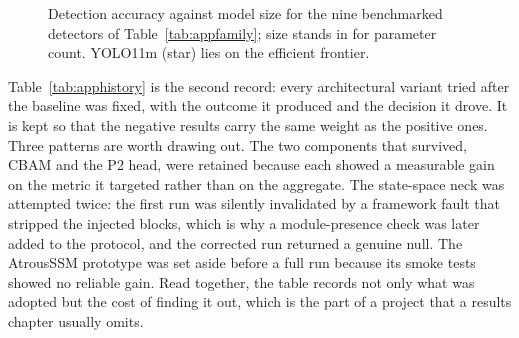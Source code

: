 \documentclass[12pt,a4paper,oneside]{report}
\begin{document}
\begin{figure}[H]
  \centering
  \caption{Detection accuracy against model size for the nine benchmarked detectors of Table~\ref{tab:appfamily}; size stands in for parameter count. YOLO11m (star) lies on the efficient frontier.}
  \label{fig:appfrontier}
\end{figure}

Table~\ref{tab:apphistory} is the second record: every architectural variant
tried after the baseline was fixed, with the outcome it produced and the
decision it drove. It is kept so that the negative results carry the same weight
as the positive ones. Three patterns are worth drawing out. The two components
that survived, CBAM and the P2 head, were retained because each showed a
measurable gain on the metric it targeted rather than on the aggregate. The
state-space neck was attempted twice: the first run was silently invalidated by
a framework fault that stripped the injected blocks, which is why a
module-presence check was later added to the protocol, and the corrected run
returned a genuine null. The AtrousSSM prototype was set aside before a full run
because its smoke tests showed no reliable gain. Read together, the table
records not only what was adopted but the cost of finding it out, which is the
part of a project that a results chapter usually omits.
\end{document}
